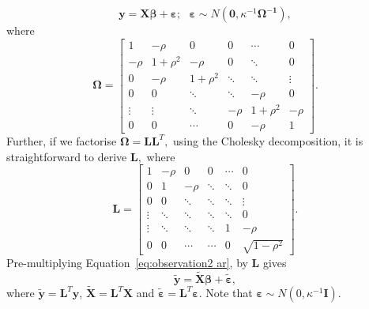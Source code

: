 \documentclass[article]{jss}
\begin{document}
\begin{equation}
  \bm{y}=\bm{X}\bm{\beta}+\bm{\varepsilon};\,\,\,\,\bm{\varepsilon}\sim N\left(\bm{0},\kappa^{-1}\bm{\Omega^{-1}}\right),\label{eq:observation2 ar}\end{equation}
where \[
\bm{\Omega}=\left[\begin{array}{cccccc}
    1 & -\rho & 0 & 0 & \cdots & 0\\
    -\rho & 1+\rho^{2} & -\rho & 0 & \ddots & 0\\
    0 & -\rho & 1+\rho^{2} & \ddots & \ddots & \vdots\\
    0 & 0 & \ddots & \ddots & -\rho & 0\\
    \vdots & \vdots & \ddots & -\rho & 1+\rho^{2} & -\rho\\
    0 & 0 & \cdots & 0 & -\rho & 1\end{array}\right].\]
Further, if we factorise $\bm{\Omega}=\bm{L}\bm{L}^{T},$ using the
Cholesky decomposition, it is straightforward to derive $\bm{L},$
where\[
\bm{L}=\left[\begin{array}{cccccc}
    1 & -\rho & 0 & 0 & \cdots & 0\\
    0 & 1 & -\rho & \ddots & \ddots & 0\\
    0 & 0 & \ddots & \ddots & \ddots & \vdots\\
    \vdots & \ddots & \ddots & \ddots & \ddots & 0\\
    \vdots & \ddots & \ddots & \ddots & 1 & -\rho\\
    0 & 0 & \cdots & \cdots & 0 & \sqrt{1-\rho^{2}}\end{array}\right].\]
Pre-multiplying Equation~\ref{eq:observation2 ar}, by $\bm{L}$ gives\begin{equation}
  \bm{\tilde{y}}=\bm{\tilde{X}}\bm{\beta}+\bm{\tilde{\varepsilon}},\label{eq:trans_obs_ar}\end{equation}
where $\bm{\tilde{y}}=\bm{L}^{T}\bm{y}$, $\bm{\tilde{X}}=\bm{L}^{T}\bm{X}$
and $\tilde{\bm{\varepsilon}}=\bm{L}^{T}\bm{\varepsilon}.$ Note that
$\bm{\varepsilon}\sim N(0,\kappa^{-1}\bm{I})$.
\end{document}
